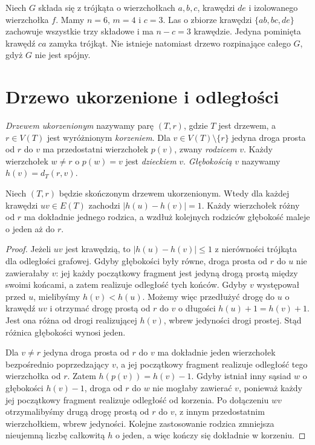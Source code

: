 \begin{przyklad}
Niech $G$ składa się z trójkąta o wierzchołkach $a,b,c$,
krawędzi $de$ i izolowanego wierzchołka $f$.
Mamy $n=6$, $m=4$ i $c=3$. Las o zbiorze krawędzi
$\{ab,bc,de\}$ zachowuje wszystkie trzy składowe
i ma $n-c=3$ krawędzie. Jedyna pominięta krawędź
$ca$ zamyka trójkąt. Nie istnieje natomiast drzewo
rozpinające całego $G$, gdyż $G$ nie jest spójny.
\end{przyklad}

\section{Drzewo ukorzenione i odległości}
\label{sec:tg-ukorzenione}

\begin{definicja}
\emph{Drzewem ukorzenionym} nazywamy parę
$(T,r)$, gdzie $T$ jest drzewem, a
$r\in V(T)$ jest wyróżnionym
\emph{korzeniem}. Dla $v\in V(T)\setminus\{r\}$ jedyna droga
prosta od $r$ do $v$ ma przedostatni wierzchołek
$p(v)$, zwany \emph{rodzicem} $v$. Każdy
wierzchołek $w\ne r$ o $p(w)=v$ jest \emph{dzieckiem}
$v$. \emph{Głębokością} $v$ nazywamy
$h(v)=d_T(r,v)$.
\end{definicja}

\begin{stwierdzenie}
Niech $(T,r)$ będzie skończonym drzewem
ukorzenionym. Wtedy dla każdej krawędzi
$uv\in E(T)$ zachodzi $|h(u)-h(v)|=1$.
Każdy wierzchołek różny od $r$ ma dokładnie
jednego rodzica, a wzdłuż kolejnych rodziców
głębokość maleje o jeden aż do $r$.
\end{stwierdzenie}

\begin{proof}
Jeżeli $uv$ jest krawędzią, to
$|h(u)-h(v)|\le1$ z nierówności trójkąta
dla odległości grafowej. Gdyby głębokości były równe, droga prosta od $r$
do $u$ nie zawierałaby $v$: jej każdy początkowy
fragment jest jedyną drogą prostą między swoimi
końcami, a zatem realizuje odległość tych końców.
Gdyby $v$ występował przed $u$, mielibyśmy
$h(v)<h(u)$. Możemy więc przedłużyć drogę do $u$
o krawędź $uv$ i otrzymać drogę prostą od $r$ do $v$
o długości $h(u)+1=h(v)+1$. Jest ona różna od drogi
realizującej $h(v)$, wbrew jedyności drogi prostej.
Stąd różnica głębokości wynosi jeden.

Dla $v\ne r$ jedyna droga prosta od $r$ do $v$
ma dokładnie jeden wierzchołek bezpośrednio
poprzedzający $v$, a jej początkowy fragment
realizuje odległość tego wierzchołka od $r$.
Zatem $h(p(v))=h(v)-1$.
Gdyby istniał inny sąsiad $w$ o głębokości $h(v)-1$,
droga od $r$ do $w$ nie mogłaby zawierać $v$,
ponieważ każdy jej początkowy fragment realizuje
odległość od korzenia. Po dołączeniu $wv$ otrzymalibyśmy
drugą drogę prostą od $r$ do $v$, z innym przedostatnim
wierzchołkiem, wbrew jedyności.
Kolejne zastosowanie rodzica zmniejsza
nieujemną liczbę całkowitą $h$ o jeden,
a więc kończy się dokładnie w korzeniu.
\end{proof}

